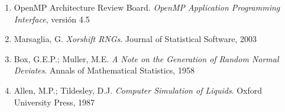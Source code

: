 \documentclass[12pt,a4paper]{article}
\begin{document}
\begin{enumerate}
    \item OpenMP Architecture Review Board. \textit{OpenMP Application Programming Interface}, versión 4.5
    \item Marsaglia, G. \textit{Xorshift RNGs}. Journal of Statistical Software, 2003
    \item Box, G.E.P.; Muller, M.E. \textit{A Note on the Generation of Random Normal Deviates}. Annals of Mathematical Statistics, 1958
    \item Allen, M.P.; Tildesley, D.J. \textit{Computer Simulation of Liquids}. Oxford University Press, 1987
\end{enumerate}
\end{document}
